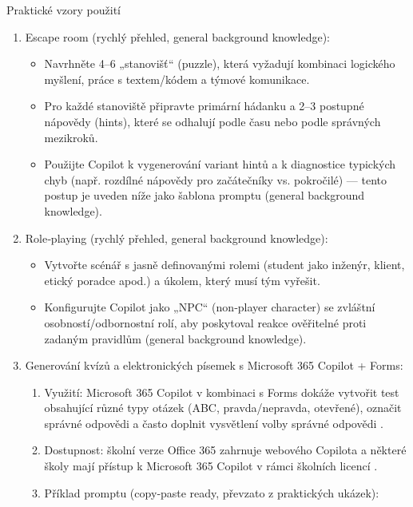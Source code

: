 Praktické vzory použití
\begin{enumerate}
  \item Escape room (rychlý přehled, general background knowledge):
    \begin{itemize}
      \item Navrhněte 4–6 „stanovišť“ (puzzle), která vyžadují kombinaci logického myšlení, práce s textem/kódem a týmové komunikace.
      \item Pro každé stanoviště připravte primární hádanku a 2–3 postupné nápovědy (hints), které se odhalují podle času nebo podle správných mezikroků.
      \item Použijte Copilot k vygenerování variant hintů a k diagnostice typických chyb (např. rozdílné nápovědy pro začátečníky vs. pokročilé) — tento postup je uveden níže jako šablona promptu (general background knowledge).
    \end{itemize}

  \item Role‑playing (rychlý přehled, general background knowledge):
    \begin{itemize}
      \item Vytvořte scénář s jasně definovanými rolemi (student jako inženýr, klient, etický poradce apod.) a úkolem, který musí tým vyřešit.
      \item Konfigurujte Copilot jako „NPC“ (non‑player character) se zvláštní osobností/odbornostní rolí, aby poskytoval reakce ověřitelné proti zadaným pravidlům (general background knowledge).
    \end{itemize}

  \item Generování kvízů a elektronických písemek s Microsoft 365 Copilot + Forms:
    \begin{enumerate}
      \item Využití: Microsoft 365 Copilot v kombinaci s Forms dokáže vytvořit test obsahující různé typy otázek (ABC, pravda/nepravda, otevřené), označit správné odpovědi a často doplnit vysvětlení volby správné odpovědi \cite{kb_ai_101_tipu_pdf_04e4a115_page_36_1}.
      \item Dostupnost: školní verze Office 365 zahrnuje webového Copilota a některé školy mají přístup k Microsoft 365 Copilot v rámci školních licencí \cite{kb_ai_101_tipu_pdf_04e4a115_page_3_1}.
      \item Příklad promptu (copy‑paste ready, převzato z praktických ukázek):
        \begin{quote}
          

\end{quote}
\end{enumerate}
\end{enumerate}
